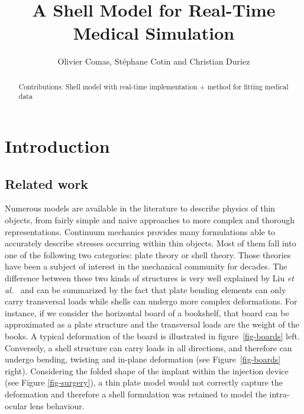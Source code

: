 \documentclass{llncs}
\begin{document}
\title{A Shell Model for Real-Time Medical Simulation}
\author{Olivier Comas, St\'ephane Cotin and Christian Duriez}

\maketitle

\begin{abstract}
Contributions: Shell model with real-time implementation + method for fitting medical data 

\end{abstract}

\section{Introduction}


\subsection{Related work}

Numerous models are available in the literature to describe physics of thin objects, from fairly simple and naive approaches to more complex and thorough representations. Continuum mechanics provides many formulations able to accurately describe stresses occurring within thin objects. Most of them fall into one of the following two categories: plate theory or shell theory. Those theories have been a subject of interest in the mechanical community for decades. The difference between these two kinds of structures is very well explained by Liu \textit{et al.}~\cite{Liu03} and can be summarized by the fact that plate bending elements can only carry transversal loads while shells can undergo more complex deformations. 
For instance, if we consider the horizontal board of a bookshelf, that board can be approximated as a plate structure and the transversal loads are the weight of the books. A typical deformation of the board is illustrated in figure~\ref{fig-boards} left. Conversely, a shell structure can carry loads in all directions, and therefore can undergo bending, twisting and in-plane deformation (see Figure~\ref{fig-boards} right). 
Considering the folded shape of the implant within the injection device (see Figure \ref{fig-surgery}), a thin plate model would not correctly capture the deformation and therefore a shell formulation was retained to model the intra-ocular lens behaviour. 
\end{document}
